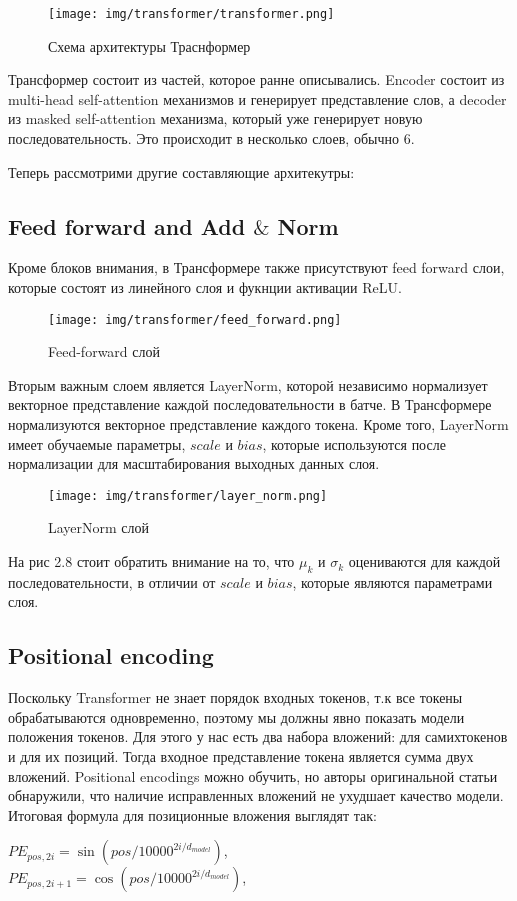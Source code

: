 \documentclass[PMI,VKR]{HSEUniversity}
\begin{document}
\begin{figure}[h]
    \centering
    \texttt{[image: img/transformer/transformer.png]}
    \caption{Схема архитектуры Траснформер}
\end{figure}

Трансформер состоит из частей, которое ранне описывались. Encoder состоит из multi-head self-attention механизмов и генерирует представление слов, а decoder из masked self-attention механизма, который уже генерирует новую последовательность. Это происходит в несколько слоев, обычно 6.

Теперь рассмотрими другие составляющие архитекутры:\\


\subsection{Feed forward and Add $\&$ Norm} 

Кроме блоков внимания, в Трансформере также присутствуют feed forward слои, которые состоят из линейного слоя и фукнции активации ReLU.

\begin{figure}[h]
    \centering
    \texttt{[image: img/transformer/feed\_forward.png]}
    \caption{Feed-forward слой}
\end{figure}

Вторым важным слоем является LayerNorm, которой независимо нормализует векторное представление каждой последовательности в батче. В Трансформере нормализуются векторное представление каждого токена. Кроме того, LayerNorm имеет обучаемые параметры, $scale$ и $bias$, которые используются после нормализации для масштабирования выходных данных слоя.

\begin{figure}[h]
    \centering
    \texttt{[image: img/transformer/layer\_norm.png]}
    \caption{LayerNorm слой}
\end{figure}

 На рис 2.8 стоит обратить внимание на то, что $\mu_{k}$ и $\sigma_{k}$ оцениваются для каждой последовательности, в отличии от $scale$ и $bias$, которые являются параметрами слоя.


\subsection{Positional encoding} 

Поскольку Transformer не знает порядок входных токенов, т.к все токены обрабатываются одновременно, поэтому мы должны явно показать модели положения токенов. Для этого у нас есть два набора вложений: для самихтокенов и для их позиций. Тогда входное представление токена является сумма двух вложений.
Positional encodings можно обучить, но авторы оригинальной статьи обнаружили, что наличие исправленных вложений не ухудшает качество модели. Итоговая формула для позиционные вложения выглядят так:
\begin{center}
$PE_{pos,2i} = \sin(pos/10000^{2i/d_{model}})$, \\
$PE_{pos,2i+1} = \cos(pos/10000^{2i/d_{model}})$, \\
\end{center}
\end{document}
